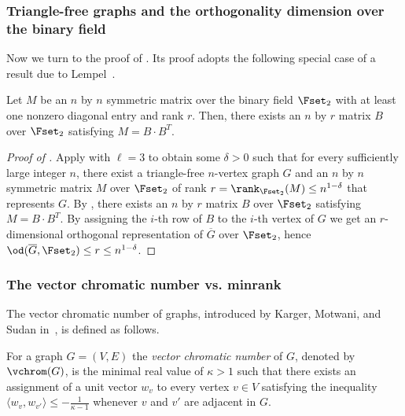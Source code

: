 \subsubsection{Triangle-free graphs and the orthogonality dimension over the binary field}\label{sec:OD_F_2_triangle}

%
Now we turn to the proof of  %
.
Its proof adopts the following special case of a result due to Lempel~\cite{Lempel75}.
\begin{lemma}\label{lem:lempel}
Let $M$ %
be  %
an $n$ by $n$ symmetric matrix over the binary field $\Fset_2$ with at least one nonzero diagonal entry and rank $r$. Then, there exists an $n$ by $r$ matrix $B$ over $\Fset_2$ satisfying $M = B \cdot B^T$.
\end{lemma}

\begin{proof}[Proof of ]
Apply  with $\ell = 3$ to obtain some $\delta >0$ such that for every sufficiently large integer $n$, there exist a triangle-free $n$-vertex graph $G$ and an $n$ by $n$ symmetric matrix $M$ over $\Fset_2$ of rank $r = {\rank}_{\Fset_2}(M) \leq n^{1-\delta}$ that represents $G$.
By , there exists an $n$ by $r$ matrix $B$ over $\Fset_2$ satisfying $M = B \cdot B^T$.
By assigning the $i$-th row of $B$ to the $i$-th vertex of $G$ we get an $r$-dimensional orthogonal representation of $\overline{G}$ over $\Fset_2$, hence $\od(\overline{G},\Fset_2) \leq r \leq n^{1-\delta}$.
\end{proof}

\subsubsection{The vector chromatic number vs. minrank}

The vector chromatic number of graphs, introduced by Karger, Motwani, and Sudan in~\cite{KargerMS98}, is defined as follows.

\begin{definition}\label{def:chi_v}
For a graph $G=(V,E)$ the \emph{vector chromatic number} of $G$,
denoted by $\vchrom(G)$, is the minimal real value of $\kappa > 1$ such
that there exists an assignment of a unit vector $w_v$ to every
vertex $v \in V$ satisfying the inequality $\langle w_{v}, w_{v'} \rangle \leq
-\frac{1}{\kappa -1}$ whenever $v$ and $v'$ are adjacent in $G$.
\end{definition}


